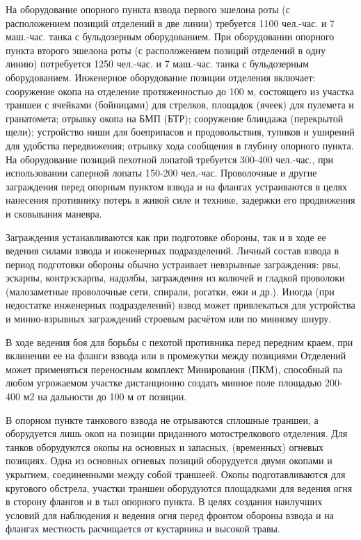 \documentclass[12pt,a4paper]{report}
\begin{document}
   На оборудование опорного пункта взвода первого эшелона роты (с расположением позиций отделений в две линии) требуется 1100 чел.-час. и 7 маш.-час. танка с бульдозерным оборудованием. При оборудовании опорного пункта второго эшелона роты (с расположением позиций отделений в одну линию) потребуется 1250 чел.-час. и 7 маш.-час. танка с бульдозерным оборудованием. Инженерное оборудование позиции отделения включает: сооружение окопа на отделение протяженностью до 100 м, состоящего из участка траншеи с ячейками (бойницами) для стрелков, площадок (ячеек) для пулемета и гранатомета; отрывку окопа на БМП (БТР); сооружение блиндажа (перекрытой щели); устройство ниши для боеприпасов и продовольствия, тупиков и уширений для удобства передвижения; отрывку хода сообщения в глубину опорного пункта. На оборудование позиций пехотной лопатой требуется 300-400 чел.-час., при использовании саперной лопаты 150-200 чел.-час.
   Проволочные и другие заграждения перед опорным пунктом взвода и на флангах устраиваются в целях нанесения противнику потерь в живой силе и технике, задержки его продвижения и сковывания маневра.
   
   Заграждения устанавливаются как при подготовке обороны, так и в ходе ее ведения силами взвода и инженерных подразделений. Личный состав взвода в период подготовки обороны обычно устраивает невзрывные заграждения: рвы, эскарпы, контрэскарпы, надолбы, заграждения из колючей и гладкой проволоки (малозаметные проволочные сети, спирали, рогатки, ежи и др.). Иногда (при недостатке инженерных подразделений) взвод может привлекаться для устройства и минно-взрывных заграждений строевым расчётом или по минному шнуру.
   
   В ходе ведения боя для борьбы с пехотой противника перед передним краем, при вклинении ее на фланги взвода или в промежутки между позициями Отделений может применяться переносным комплект Минирования (ПКМ), способный па любом угрожаемом участке дистанционно создать минное поле площадью 200-400 м2 на дальности до 100 м от позиции.
   
   В опорном пункте танкового взвода не отрываются сплошные траншеи, а оборудуется лишь окоп на позиции приданного мотострелкового отделения. Для танков оборудуются окопы на основных и запасных, (временных) огневых позициях. Одна из основных огневых позиций оборудуется двумя окопами и укрытием, соединенными между собой траншеей. Окопы подготавливаются для кругового обстрела, участки траншеи оборудуются площадками для ведения огня в сторону флангов и в тыл опорного пункта.
   В целях создания наилучших условий для наблюдения и ведения огня перед фронтом обороны взвода и на флангах местность расчищается от кустарника и высокой травы.
\end{document}
